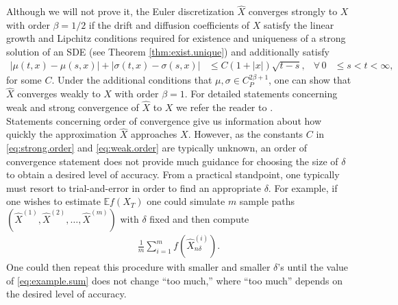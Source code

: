 \documentclass[12pt]{book}
\numberwithin{equation}{chapter}
\theoremstyle{plain}
\numberwithin{theorem}{section}
\theoremstyle{definition}
\numberwithin{exercise}{chapter}
\newcommand{\<}{\langle}
\renewcommand{\>}{\rangle}
\renewcommand{\(}{\left(}
\renewcommand{\)}{\right)}
\renewcommand{\[}{\left[}
\renewcommand{\]}{\right]}
\newcommand\Eb{\mathds{E}}
\newcommand\sig{\sigma}
\newcommand\del{\delta}
\newcommand\Xh{\widehat{X}}
\begin{document}
\noindent
Although we will not prove it, the Euler discretization $\Xh$ converges strongly to $X$ with order $\beta = 1/2$ if the drift and diffusion coefficients of $X$ satisfy the linear growth and Lipchitz conditions required for existence and uniqueness of a strong solution of an SDE (see Theorem \ref{thm:exist.unique}) and additionally satisfy
\begin{align}
|\mu(t,x) - \mu(s,x) | + |\sig(t,x) - \sig(s,x) |
	&\leq C (1 + |x|)\sqrt{t-s} , &
\forall \, 0
	&\leq s < t < \infty ,
\end{align}
for some $C$.  Under the additional conditions that $\mu, \sig \in C_P^{2\beta+1}$, one can show that $\Xh$ converges weakly to $X$ with order $\beta = 1$.  For detailed statements concerning weak and strong convergence of $\Xh$ to $X$ we refer the reader to \cite{kloeden-platen}.
\\[0.5em]
Statements concerning order of convergence give us information about how quickly the approximation $\Xh$ approaches $X$.  However, as the constants $C$ in \eqref{eq:strong.order} and \eqref{eq:weak.order} are typically unknown, an order of convergence statement does not provide much guidance for choosing the size of $\del$ to obtain a desired level of accuracy.  From a practical standpoint, one typically must resort to trial-and-error in order to find an appropriate $\del$.  For example, if one wishes to estimate $\Eb f(X_T)$ one could simulate $m$ sample paths $(\Xh^{(1)}, \Xh^{(2)},\ldots,\Xh^{(m)})$ with $\del$ fixed and then compute
\begin{align}
\frac{1}{m} \sum_{i=1}^m f(\Xh_{n\del}^{(i)}) . \label{eq:example.sum}
\end{align}
One could then repeat this procedure with smaller and smaller $\del$'s until the value of \eqref{eq:example.sum} does not change ``too much,'' where ``too much'' depends on the desired level of accuracy.
\end{document}
